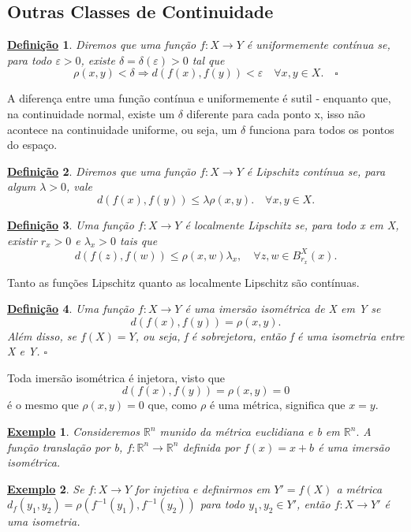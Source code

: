 \documentclass{article}
\newtheorem*{def*}{\underline{Defini\c c\~ao}}
\newtheorem{example}{\underline{Exemplo}}
\begin{document}
\subsection{Outras Classes de Continuidade}
 \begin{def*}
   Diremos que uma função \(f:X\rightarrow Y\) é uniformemente contínua se, para todo \(\varepsilon >0\), existe \(\delta =\delta (\varepsilon )>0\) tal que 
     \[
       \rho (x, y) < \delta \Rightarrow d(f(x), f(y)) < \varepsilon \quad \forall x, y\in X.\quad\square
     \]
 \end{def*}
  A diferença entre uma função contínua e uniformemente é sutil - enquanto que, na continuidade normal, existe um \(\delta \) diferente para cada ponto x, isso não acontece
na continuidade uniforme, ou seja, um \(\delta \) funciona para todos os pontos do espaço.
\begin{def*}
  Diremos que uma função \(f:X\rightarrow Y\) é Lipschitz contínua se, para algum \(\lambda >0\), vale 
    \[
      d(f(x), f(y))\leq \lambda \rho (x, y).\quad \forall x, y\in X.
    \]
\end{def*}
\begin{def*}
  Uma função \(f:X\rightarrow Y\) é localmente Lipschitz se, para todo x em X, existir \(r_{x}>0\) e \(\lambda_{x}>0\) tais que 
    \[
      d(f(z), f(w))\leq \rho (x, w)\lambda_{x},\quad \forall z, w\in B_{r_{x}}^{X}(x).
    \]
\end{def*}
  Tanto as funções Lipschitz quanto as localmente Lipschitz são contínuas.
 \begin{def*}
  Uma função \(f:X\rightarrow Y\) é uma imersão isométrica de X em Y se 
    \[
      d(f(x), f(y)) = \rho (x, y).
    \]
  Além disso, se \(f(X) = Y\), ou seja, f é sobrejetora, então f é uma isometria entre X e Y. \(\square\)
 \end{def*}
  Toda imersão isométrica é injetora, visto que 
    \[
      d(f(x), f(y)) = \rho (x, y) = 0
    \]
  é o mesmo que \(\rho (x, y) = 0\) que, como \(\rho \) é uma métrica, significa que \(x=y\).
  \begin{example}
    Consideremos \(\mathbb{R}^{n}\) munido da métrica euclidiana e b em \(\mathbb{R}^{n}.\) A função translação por b,
  \(f:\mathbb{R}^{n}\rightarrow \mathbb{R}^{n}\) definida por \(f(x) = x + b\) é uma imersão isométrica.
  \end{example}
 \begin{example}
   Se \(f:X\rightarrow Y\) for injetiva e definirmos em \(Y' = f(X)\) a métrica
  \(d_{f}(y_{1}, y_{2}) = \rho (f^{-1}(y_{1}), f^{-1}(y_{2}))\) para todo \(y_{1}, y_{2}\in Y'\), então
  \(f:X\rightarrow Y'\) é uma isometria.
 \end{example}
\end{document}
